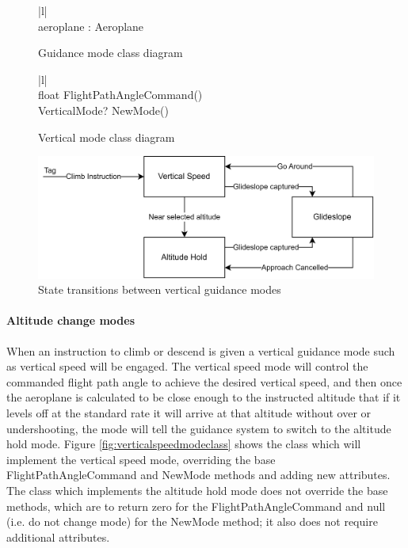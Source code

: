 \documentclass{article}
\begin{document}
\begin{figure}[H]
\centering
\begin{tabular}{ |l| } 
\hline
{} \\
\hline
aeroplane : Aeroplane \\
\hline
\end{tabular}
\caption{\label{fig:guidancemodeclass}Guidance mode class diagram}
\end{figure}

\begin{figure}[H]
\centering
\begin{tabular}{ |l| } 
\hline
{} \\
\hline
float FlightPathAngleCommand() \\
VerticalMode? NewMode() \\
\hline
\end{tabular}
\caption{\label{fig:verticalmodeclass}Vertical mode class diagram}
\end{figure}

\begin{figure}[H]
\centering
\includegraphics{diagrams/vertnav.png}
\caption{\label{fig:vertnav}State transitions between vertical guidance modes}
\end{figure}

\paragraph{Altitude change modes}
When an instruction to climb or descend is given a vertical guidance mode such as vertical speed will be engaged.
The vertical speed mode will control the commanded flight path angle to achieve the desired vertical speed, and then once the aeroplane is calculated to be close enough to the instructed altitude that if it levels off at the standard rate it will arrive at that altitude without over or undershooting, the mode will tell the guidance system to switch to the altitude hold mode.
Figure \ref{fig:verticalspeedmodeclass} shows the class which will implement the vertical speed mode, overriding the base FlightPathAngleCommand and NewMode methods and adding new attributes.
The class which implements the altitude hold mode does not override the base methods, which are to return zero for the FlightPathAngleCommand and null (i.e. do not change mode) for the NewMode method; it also does not require additional attributes.
\end{document}

